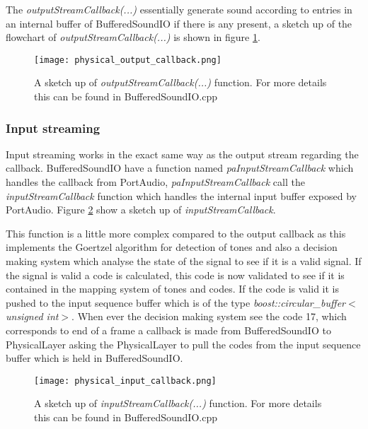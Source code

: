 		The \textit{outputStreamCallback(...)} essentially generate sound according to entries in an internal buffer of BufferedSoundIO
		if there is any present, a sketch up of the flowchart of \textit{outputStreamCallback(...)} is shown in figure \ref{fig:physical_output_callback}.
		
		\begin{figure}[htb]
			\begin{center}
			\texttt{[image: physical\_output\_callback.png]}%
			\caption{A sketch up of \textit{outputStreamCallback(...)} function. For more details this can be found in BufferedSoundIO.cpp}
			\label{fig:physical_output_callback}
			\end{center}
		\end{figure}
		
		\subsubsection{Input streaming}
		Input streaming works in the exact same way as the output stream regarding the callback. BufferedSoundIO have a function named
		\textit{paInputStreamCallback} which handles the callback from PortAudio, \textit{paInputStreamCallback} call the \textit{inputStreamCallback}
		function which handles the internal input buffer exposed by PortAudio. Figure \ref{fig:physical_input_callback} show a sketch up of \textit{inputStreamCallback}.
		
		This function is a little more complex compared to the output callback as this implements the Goertzel algorithm for detection of tones and also
		a decision making system which analyse the state of the signal to see if it is a valid signal. If the signal is valid a code is calculated, this
		code is now validated to see if it is contained in the mapping system of tones and codes. If the code is valid it is pushed to the input
		sequence buffer which is of the type \textit{boost::circular\_buffer$<$unsigned int$>$}. When ever the decision making system see the code 17,
		which corresponds to end of a frame a callback is made from BufferedSoundIO to PhysicalLayer asking the PhysicalLayer to pull the codes from
		the input sequence buffer which is held in BufferedSoundIO.
		
		\begin{figure}[htb]
			\begin{center}
			\texttt{[image: physical\_input\_callback.png]}%
			\caption{A sketch up of \textit{inputStreamCallback(...)} function. For more details this can be found in BufferedSoundIO.cpp}
			\label{fig:physical_input_callback}
			\end{center}
		\end{figure}
		
